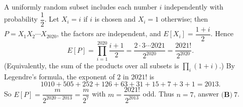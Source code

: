 A uniformly random subset includes each number $i$ independently with probability $\dfrac{1}{2}$. Let $X_i=i$ if $i$ is chosen and $X_i=1$ otherwise; then $P=X_1X_2\cdots X_{2020}$, the factors are independent, and $E[X_i]=\dfrac{1+i}{2}$. Hence
\[E[P]=\prod_{i=1}^{2020}\dfrac{i+1}{2}=\dfrac{2\cdot3\cdots2021}{2^{2020}}=\dfrac{2021!}{2^{2020}}.\]
(Equivalently, the sum of the products over all subsets is $\prod_{i}(1+i)$.) By Legendre's formula, the exponent of $2$ in $2021!$ is
\[1010+505+252+126+63+31+15+7+3+1=2013 .\]
So $E[P]=\dfrac{m}{2^{2020-2013}}=\dfrac{m}{2^7}$ with $m=\dfrac{2021!}{2^{2013}}$ odd. Thus $n=7$, answer $\boxed{\textbf{(B)}\ 7}$.
